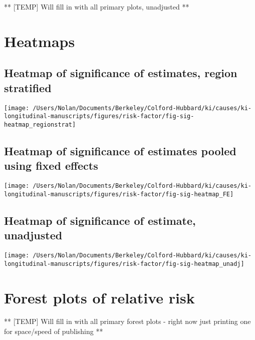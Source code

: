 \documentclass[9pt,]{book}
\begin{document}
\raggedright

** {[}TEMP{]} Will fill in with all primary plots, unadjusted **

\chapter{Heatmaps}\label{heatmaps}

\raggedright

\section{Heatmap of significance of estimates, region
stratified}\label{heatmap-of-significance-of-estimates-region-stratified}

\texttt{[image: /Users/Nolan/Documents/Berkeley/Colford-Hubbard/ki/causes/ki-longitudinal-manuscripts/figures/risk-factor/fig-sig-heatmap\_regionstrat]}

\section{Heatmap of significance of estimates pooled using fixed
effects}\label{heatmap-of-significance-of-estimates-pooled-using-fixed-effects}

\texttt{[image: /Users/Nolan/Documents/Berkeley/Colford-Hubbard/ki/causes/ki-longitudinal-manuscripts/figures/risk-factor/fig-sig-heatmap\_FE]}

\section{Heatmap of significance of estimate,
unadjusted}\label{heatmap-of-significance-of-estimate-unadjusted}

\texttt{[image: /Users/Nolan/Documents/Berkeley/Colford-Hubbard/ki/causes/ki-longitudinal-manuscripts/figures/risk-factor/fig-sig-heatmap\_unadj]}

\chapter{Forest plots of relative risk}\label{RR-forest}

\raggedright

** {[}TEMP{]} Will fill in with all primary forest plots - right now
just printing one for space/speed of publishing **


\end{document}
